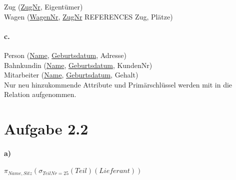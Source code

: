 \documentclass[12pt]{article}
\begin{document}
			Zug (\underline{ZugNr}, Eigentümer)\\[1.3em]
			
			Wagen (\underline{WagenNr}, \underline{ZugNr} REFERENCES Zug, Plätze)\\[1.3em]
			
		\paragraph*{c.}
			Person (\underline{Name}, \underline{Geburtsdatum}, Adresse) \\[1,3em]
			
			Bahnkundin (\underline{Name}, \underline{Geburtsdatum}, KundenNr) \\[1,3em]
			
			Mitarbeiter (\underline{Name}, \underline{Geburtsdatum}, Gehalt) \\[1,3em]
		
			Nur neu hinzukommende Attribute und Primärschlüssel werden mit in die Relation aufgenommen.
	
	\newpage	
	\section*{Aufgabe 2.2}
	
		\paragraph*{a)}
			$\pi_{Name, Sitz}(\sigma_{TeilNr=25}(Teil)(Lieferant))$
	
		
\end{document}
